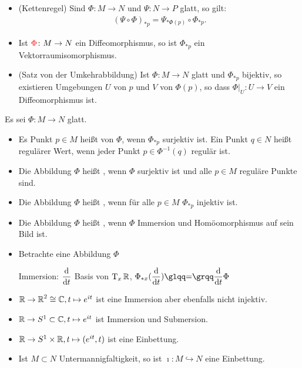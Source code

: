
\begin{bem*}\hfill
  \begin{itemize}
  \item (Kettenregel) Sind $\Phi \colon M \to N$ und $\Psi \colon N \to P$ glatt, so gilt:
    \begin{align*}
      (\Psi \circ \Phi)_{*p} = \Psi_{*\Phi(p)} \circ \Phi_{*p}.
    \end{align*}
  \item Ist $\textcolor{red}{\Phi} \colon M \to N$ ein Diffeomorphismus, so ist $\Phi_{*p}$ ein Vektorraumisomorphismus. %
  \item (Satz von der Umkehrabbildung) Ist $\Phi \colon M \to N$ glatt und $\Phi_{*p}$ bijektiv, so existieren Umgebungen $U$ von $p$ und $V$ von $\Phi(p)$, so dass $\Phi|_{U} \colon U \to V$ ein Diffeomorphismus ist.
  \end{itemize}
\end{bem*}

\begin{dfn}
  Es sei $\Phi \colon M \to N$ glatt.
  \begin{itemize}
  \item Es Punkt $p \in M$ heißt  von $\Phi$, wenn $\Phi_{*p}$ surjektiv ist. Ein Punkt $q \in N$ heißt regulärer Wert, wenn jeder Punkt $p \in \Phi^{-1}(q)$ regulär ist.
  \item Die Abbildung $\Phi$ heißt , wenn $\Phi$ surjektiv ist und alle $p \in M$ reguläre Punkte sind.
  \item Die Abbildung $\Phi$ heißt , wenn für alle $p \in M$ $\Phi_{*p}$ injektiv ist.
  \item Die Abbildung $\Phi$ heißt , wenn $\Phi$ Immersion und Homöomorphismus auf sein Bild ist.
  \end{itemize}
\end{dfn}

\begin{bsp}
  \begin{itemize}
  \item Betrachte eine Abbildung $\Phi$


    Immersion: $\dfrac{\mathrm{d} }{\mathrm{d} t}$ Basis von $\operatorname{T}_x\operatorname{\mathbb{R}}$, $\Phi_{*x}(\difffrac{t}) \quot{=} \difffrac{t}\Phi$
  \item $\operatorname{\mathbb{R}} \to \operatorname{\mathbb{R}}^2 \cong \operatorname{\mathbb{C}}, t \mapsto e^{it}$ ist eine Immersion aber ebenfalls nicht injektiv.
  \item $\operatorname{\mathbb{R}} \to S^1 \subset \operatorname{\mathbb{C}}, t \mapsto e^{it}$ ist Immersion und Submersion.
  \item $\operatorname{\mathbb{R}} \to S^1 \times \operatorname{\mathbb{R}}, t \mapsto (e^{it},t)$ ist eine Einbettung.


  \item Ist $M \subset N$ Untermannigfaltigkeit, so ist $\imath \colon M \hookrightarrow N$ eine Einbettung.%
  \end{itemize}
\end{bsp}

